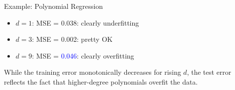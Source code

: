 \documentclass[11pt,compress,t,notes=noshow, xcolor=table]{beamer}
\newenvironment{knitrout}{}{} %
\begin{document}
\begin{vbframe}{Example: Polynomial Regression}
\begin{itemize}
  \footnotesize
  \item $d = 1$: MSE = 0.038: clearly underfitting
  \item $d = 3$: MSE = 0.002: pretty OK
  \item $d = 9$: MSE = \textcolor{blue}{0.046}: clearly overfitting
\end{itemize}

\vfill

While the training error monotonically decreases for rising $d$, 
the test error reflects the fact that higher-degree polynomials overfit 
the data.

\end{vbframe}


% 
% 
% 
% 
% 
% 
% 

% 
% 
% 
% 
% 
% 
% 
\end{document}
